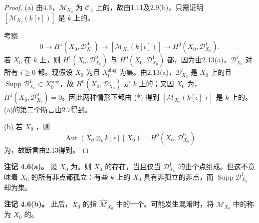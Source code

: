 \begin{proof}
(a) 由4.3，$\mathcal M_{X_0}$ 为 $\mathcal C_\Lambda$ 上的，故由1.11及2.9(b)，只需证明 $[\mathcal M_{X_0}(k[\epsilon])]$ 是 $k$ 上的。

考察
\[
0\longrightarrow H^1(X_0,\mathcal D^0_{X_0})\longrightarrow
[\mathcal M_{X_0}(k[\epsilon])]\longrightarrow H^0(X_0,\mathcal D^1_{X_0}).\tag{*}
\]
若 $X_0$ 在 $k$ 上，则 $H^1(X_0,\mathcal D^0_{X_0})$ 与 $H^0(X_0,\mathcal D^1_{X_0})$ 都，因为由2.13(a)，$\mathcal D^i_{X_0}$ 对所有 $i\geq0$ 都。现假设 $X_0$ 为且 $X_0^{\mathrm{sing}}$ 为集。由2.13(a)，$\mathcal D^1_{X_0}$ 是 $X_0$ 上的且 $\operatorname{Supp}\mathcal D^1_{X_0}\subset X_0^{\mathrm{sing}}$，故 $H^0(X_0,\mathcal D^1_{X_0})$ 是 $k$ 上的；又因 $X_0$ 为，$H^1(X_0,\mathcal D^0_{X_0})=0$。因此两种情形下都由 (*) 得到 $[\mathcal M_{X_0}(k[\epsilon])]$ 是 $k$ 上的。(a)的第二个断言由2.7得到。

(b) 若 $X_0$ ，则
\[
\operatorname{Aut}(X_0\otimes_k k[\epsilon]\mid X_0)=H^0(X_0,\mathcal D^0_{X_0})
\]
为，故断言由2.13得到。
\end{proof}

\textbf{注记 4.6(a)。} 设 $X_0$ 为。则 $X_0$ 的存在，当且仅当 $\mathcal D^1_{X_0}$ 的由个点组成。但这不意味着 $X_0$ 的所有非点都孤立：有些 $k$ 上的 $X_0$ 具有非孤立的非点，而 $\operatorname{Supp}\mathcal D^1_{X_0}$ 却为集。

\textbf{注记 4.6(b)。} 此后，$X_0$ 的指 $\widehat{\mathcal M}_{X_0}$ 中的一个。可能发生混淆时，将 $\mathcal M_{X_0}$ 中的称为 $X_0$ 的。

